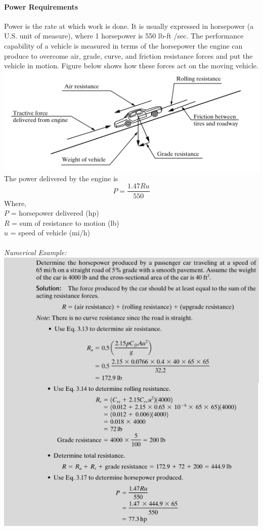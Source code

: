 \paragraph{Power Requirements}
Power is the rate at which work is done. It is usually expressed in horsepower (a U.S. unit of measure), where 1 horsepower is 550 lb-ft /sec. The performance capability of a vehicle is measured in terms of the horsepower the engine can produce to overcome air, grade, curve, and friction resistance forces and put the vehicle in motion. Figure below shows how these forces act on the moving vehicle.\\
\includegraphics[scale=0.9]{gfx/fig9.png}\\
The power delivered by the engine is
\begin{equation}
	P = \frac{1.47Ru}{550}
\end{equation}
Where,\\
\hspace*{10mm}$P$ = horsepower delivered (hp)\\
\hspace*{10mm}$R$ = sum of resistance to motion (lb)\\
\hspace*{10mm}$u$ = speed of vehicle (mi/h)\\\\
\emph{Numerical Example:}\\
\includegraphics[scale=0.5]{gfx/fig10.png}\\
